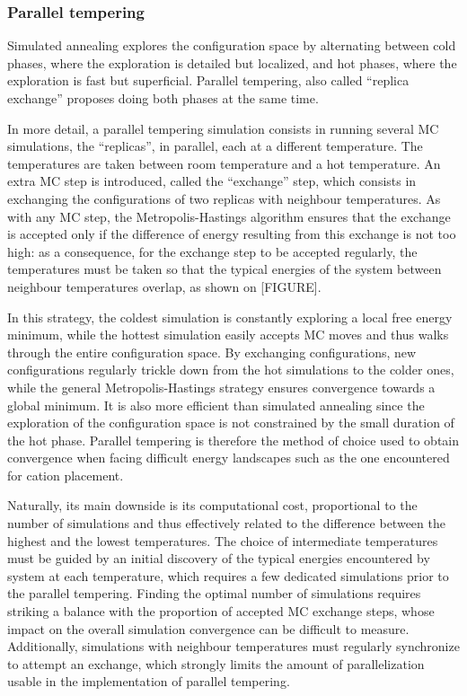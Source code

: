 \documentclass[main.tex]{subfiles}
\begin{document}

\subsubsection{Parallel tempering}

Simulated annealing explores the configuration space by alternating between cold phases, where the exploration is detailed but localized, and hot phases, where the exploration is fast but superficial. Parallel tempering, also called ``replica exchange'' proposes doing both phases at the same time.

In more detail, a parallel tempering simulation consists in running several MC simulations, the ``replicas'', in parallel, each at a different temperature. The temperatures are taken between room temperature and a hot temperature. An extra MC step is introduced, called the ``exchange'' step, which consists in exchanging the configurations of two replicas with neighbour temperatures. As with any MC step, the Metropolis-Hastings algorithm ensures that the exchange is accepted only if the difference of energy resulting from this exchange is not too high: as a consequence, for the exchange step to be accepted regularly, the temperatures must be taken so that the typical energies of the system between neighbour temperatures overlap, as shown on [FIGURE].

In this strategy, the coldest simulation is constantly exploring a local free energy minimum, while the hottest simulation easily accepts MC moves and thus walks through the entire configuration space. By exchanging configurations, new configurations regularly trickle down from the hot simulations to the colder ones, while the general Metropolis-Hastings strategy ensures convergence towards a global minimum. It is also more efficient than simulated annealing since the exploration of the configuration space is not constrained by the small duration of the hot phase. Parallel tempering is therefore the method of choice used to obtain convergence when facing difficult energy landscapes such as the one encountered for cation placement.

Naturally, its main downside is its computational cost, proportional to the number of simulations and thus effectively related to the difference between the highest and the lowest temperatures. The choice of intermediate temperatures must be guided by an initial discovery of the typical energies encountered by system at each temperature, which requires a few dedicated simulations prior to the parallel tempering. Finding the optimal number of simulations requires striking a balance with the proportion of accepted MC exchange steps, whose impact on the overall simulation convergence can be difficult to measure. Additionally, simulations with neighbour temperatures must regularly synchronize to attempt an exchange, which strongly limits the amount of parallelization usable in the implementation of parallel tempering.
\end{document}
